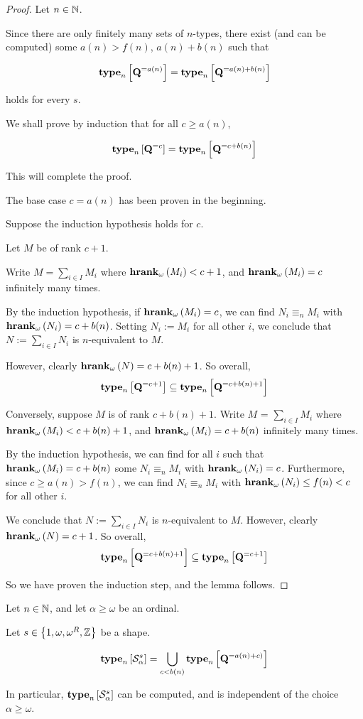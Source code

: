 \begin{proof}
  Let $n \in \mathbb{N}$.

  Since there are only finitely many sets of $n$-types,
  there exist (and can be computed)
  some $a(n) > f(n)$, $a(n) + b(n)$ such that

  $$\mathbf{type}_{n} \left[ {\mathbf{Q}^{= a(n)}} \right] = \mathbf{type}_{n} \left[ {\mathbf{Q}^{= a(n) + b(n)}} \right]$$

  holds for every $s$.

  We shall prove by induction that for all $c \ge a(n)$,

  $$\mathbf{type}_{n} \left[ {\mathbf{Q}^{= c}} \right] = \mathbf{type}_{n} \left[ {\mathbf{Q}^{= c + b(n)}} \right]$$

  This will complete the proof.

  The base case $c = a(n)$ has been proven in the beginning.

  Suppose the induction hypothesis holds for $c$.

  Let $M$ be of rank $c + 1$.

  Write $M = \sum_{i \in I} M_i$ where $\mathbf{hrank}_{\omega}\left( M_i \right) < c + 1$,
  and $\mathbf{hrank}_{\omega}\left( M_i \right) = c$ infinitely many times.

  By the induction hypothesis,
  if $\mathbf{hrank}_{\omega}\left( M_i \right) = c$, we can find $N_i \equiv_n M_i$ with $\mathbf{hrank}_{\omega}\left( N_i \right) = c + b(n)$.
  Setting $N_i := M_i$ for all other $i$, we conclude that $N := \sum_{i \in I} N_i$
  is $n$-equivalent to $M$.

  However, clearly $\mathbf{hrank}_{\omega}\left( N \right) = c + b(n) + 1$. So overall,
  $$\mathbf{type}_{n} \left[ {\mathbf{Q}^{= c + 1}} \right] \subseteq \mathbf{type}_{n} \left[ {\mathbf{Q}^{= c + b(n) + 1}} \right]$$

  Conversely, suppose $M$ is of rank $c + b(n) + 1$.
  Write $M$ = $\sum_{i \in I} M_i$ where $\mathbf{hrank}_{\omega}\left( M_i \right) < c + b(n) + 1$,
  and $\mathbf{hrank}_{\omega}\left( M_i \right) = c + b(n)$ infinitely many times.

  By the induction hypothesis,
  we can find for all $i$ such that $\mathbf{hrank}_{\omega}\left( M_i \right) = c + b(n)$ some
  $N_i \equiv_n M_i$ with $\mathbf{hrank}_{\omega}\left( N_i \right) = c$.
  Furthermore, since $c \ge a(n) > f(n)$, we can
  find $N_i \equiv_n M_i$ with $\mathbf{hrank}_{\omega}\left( N_i \right) \le f(n) < c$ for all other $i$.

  We conclude that $N := \sum_{i \in I} N_i$ is $n$-equivalent to $M$.
  However, clearly $\mathbf{hrank}_{\omega}\left( N \right) = c + 1$. So overall,
  $$\mathbf{type}_{n} \left[ {\mathbf{Q}^{= c + b(n) + 1}} \right] \subseteq \mathbf{type}_{n} \left[ {\mathbf{Q}^{= c + 1}} \right]$$

  So we have proven the induction step, and the lemma follows.
\end{proof}

\begin{lemma}
  Let $n \in \mathbb{N}$, and let $\alpha \ge \omega$ be an ordinal.

  Let $s \in \left\{ {1, \omega, \omega^R, \mathbb{Z}} \right\}$ be a shape.

  $$\mathbf{type}_{n} \left[ {\mathcal{S}^{s}_{\alpha}} \right] = \bigcup_{c < b(n)}{\mathbf{type}_{n} \left[ {\mathbf{Q}^{= a(n) + c)}} \right]}$$

  In particular, $\mathbf{type}_{n} \left[ {\mathcal{S}^{s}_{\alpha}} \right]$ can be
  computed, and is independent of the choice $\alpha \ge \omega$.
\end{lemma}

